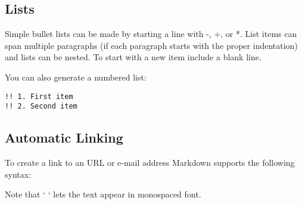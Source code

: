 \documentclass[a4paper,11pt,headsepline]{scrartcl}
\begin{document}
\subsection{Lists}
Simple bullet lists can be made by starting a line with -, +, or *. List items can span multiple paragraphs (if each paragraph starts with the proper indentation) and lists can be nested. To start with a new item include a blank line.

You can also generate a numbered list:
\lstset{language=Fortran}
\begin{lstlisting}
!! 1. First item
!! 2. Second item
\end{lstlisting}
\subsection{Automatic Linking}
To create a link to an URL or e-mail address Markdown supports the following syntax:

Note that ` `   lets the text appear in monospaced font.
\end{document}
